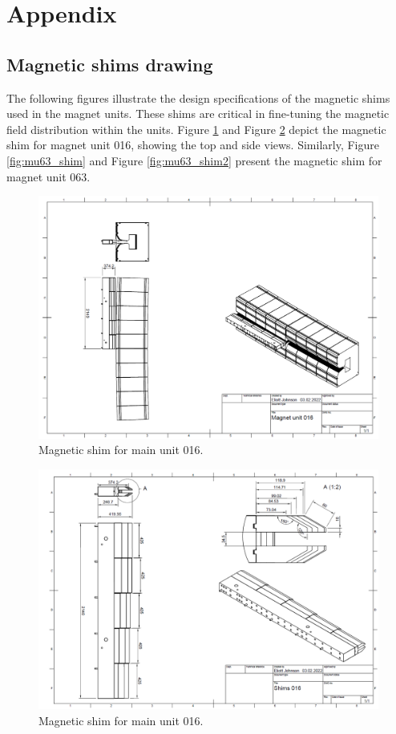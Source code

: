 \section{Appendix}
\subsection{Magnetic shims drawing}
\label{magnetic shims}

The following figures illustrate the design specifications of the magnetic shims used in the magnet units. These shims are critical in fine-tuning the magnetic field distribution within the units. Figure \ref{fig:mu16_shim} and Figure \ref{fig:mu16_shim2} depict the magnetic shim for magnet unit 016, showing the top and side views. Similarly, Figure \ref{fig:mu63_shim} and Figure \ref{fig:mu63_shim2} present the magnetic shim for magnet unit 063.

\begin{figure}[h]
    \centering
    \includegraphics[width=1.0\textwidth]{Appendix/images/mu16_shim.png}
    \caption{Magnetic shim for main unit 016.}
    \label{fig:mu16_shim}
\end{figure}

\begin{figure}[h]
    \centering
    \includegraphics[width=1.0\textwidth]{Appendix/images/mu16_shim2.png}
    \caption{Magnetic shim for main unit 016.}
    \label{fig:mu16_shim2}
\end{figure}

